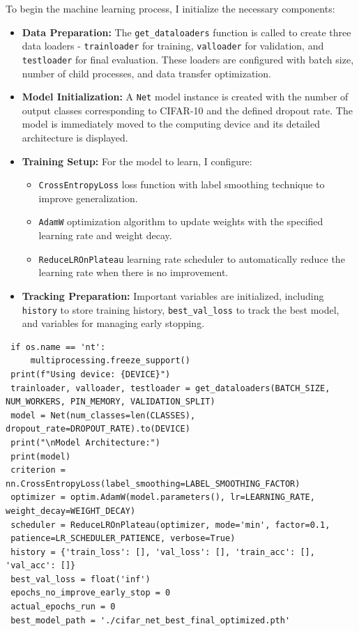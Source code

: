 \documentclass[12pt, a4paper, openany]{report}
\begin{document}
 To begin the machine learning process, I initialize the necessary components:
 \begin{itemize}
     \item \textbf{Data Preparation:} The \texttt{get\_dataloaders} function is called to create three data loaders - \texttt{trainloader} for training, \texttt{valloader} for validation, and \texttt{testloader} for final evaluation. These loaders are configured with batch size, number of child processes, and data transfer optimization. %
     \item \textbf{Model Initialization:} A \texttt{Net} model instance is created with the number of output classes corresponding to CIFAR-10 and the defined dropout rate. The model is immediately moved to the computing device and its detailed architecture is displayed. %
     \item \textbf{Training Setup:} For the model to learn, I configure: %
     \begin{itemize}
         \item \texttt{CrossEntropyLoss} loss function with label smoothing technique to improve generalization. %
         \item \texttt{AdamW} optimization algorithm to update weights with the specified learning rate and weight decay. %
         \item \texttt{ReduceLROnPlateau} learning rate scheduler to automatically reduce the learning rate when there is no improvement. %
     \end{itemize}
     \item \textbf{Tracking Preparation:} Important variables are initialized, including \texttt{history} to store training history, \texttt{best\_val\_loss} to track the best model, and variables for managing early stopping. %
 \end{itemize}

 \begin{verbatim}
 if os.name == 'nt': 
     multiprocessing.freeze_support()
 print(f"Using device: {DEVICE}")
 trainloader, valloader, testloader = get_dataloaders(BATCH_SIZE, NUM_WORKERS, PIN_MEMORY, VALIDATION_SPLIT)
 model = Net(num_classes=len(CLASSES), dropout_rate=DROPOUT_RATE).to(DEVICE)
 print("\nModel Architecture:")
 print(model)
 criterion = nn.CrossEntropyLoss(label_smoothing=LABEL_SMOOTHING_FACTOR)
 optimizer = optim.AdamW(model.parameters(), lr=LEARNING_RATE, weight_decay=WEIGHT_DECAY)
 scheduler = ReduceLROnPlateau(optimizer, mode='min', factor=0.1,
 patience=LR_SCHEDULER_PATIENCE, verbose=True)
 history = {'train_loss': [], 'val_loss': [], 'train_acc': [], 'val_acc': []}
 best_val_loss = float('inf')
 epochs_no_improve_early_stop = 0
 actual_epochs_run = 0
 best_model_path = './cifar_net_best_final_optimized.pth' 
 \end{verbatim}
\end{document}
